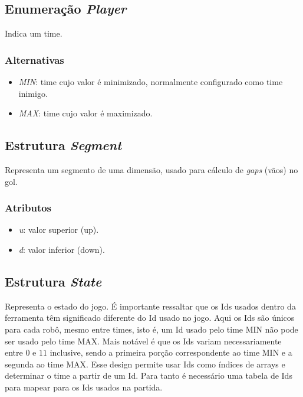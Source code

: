\subsection*{Enumeração \textit{Player}}

Indica um time.

\subsubsection*{Alternativas}

\begin{itemize}
  \item \textit{MIN}: time cujo valor é minimizado, normalmente configurado como
    time inimigo.
  \item \textit{MAX}: time cujo valor é maximizado.
\end{itemize}

\subsection*{Estrutura \textit{Segment}}

Representa um segmento de uma dimensão, usado para cálculo de \textit{gaps}
(vãos) no gol.

\subsubsection*{Atributos}

\begin{itemize}
  \item \textit{u}: valor superior (up).
  \item \textit{d}: valor inferior (down).
\end{itemize}

\subsection*{Estrutura \textit{State}}

Representa o estado do jogo.  É importante ressaltar que os Ids usados dentro da
ferramenta têm significado diferente do Id usado no jogo.  Aqui os Ids são
únicos para cada robô, mesmo entre times, isto é, um Id usado pelo time MIN não
pode ser usado pelo time MAX.  Mais notável é que os Ids variam necessariamente
entre $0$ e $11$ inclusive, sendo a primeira porção correspondente ao time MIN e
a segunda ao time MAX.  Esse design permite usar Ids como índices de arrays e
determinar o time a partir de um Id.  Para tanto é necessário uma tabela de Ids
para mapear para os Ids usados na partida.

